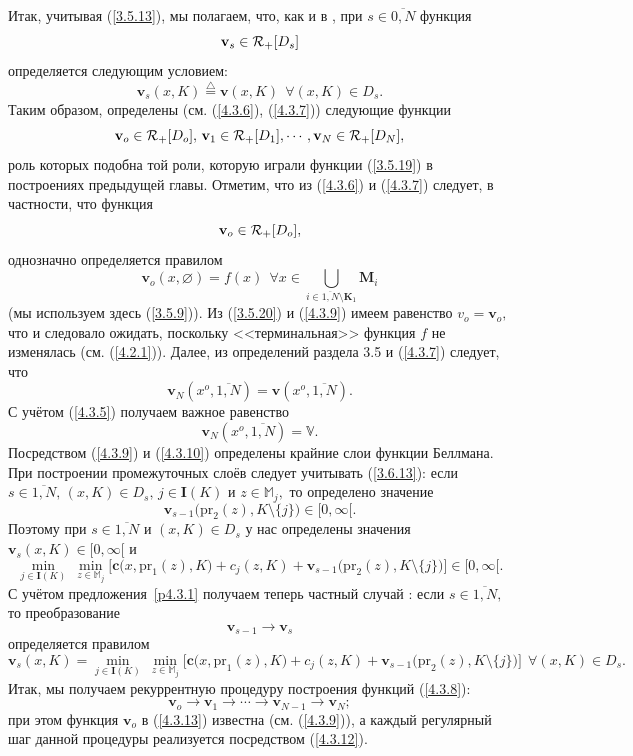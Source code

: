 \documentclass[12pt]{report}
\newcommand{\bfn}{\begin{equation}}
\newcommand{\efn}{\end{equation}}
\newcommand{\df}{\stackrel{\triangle}{=}}
\newcommand{\ov}{\overline}
\newcommand{\sm}{\setminus}
\newcommand{\fa}{\forall}
\newcommand{\car}{{\cal R}}
\newcommand{\bbm}{{\mathbb M}}
\newcommand{\emp}{\varnothing}
\begin{document}
{Итак, учитывая (\ref{3.5.13}), мы полагаем, что, как и в \cite[(6.12)]{Cha3`}, при
$s\in \ov{0,N}$ функция
\bfn\label{4.3.6`}\mathbf{v}_s\in \car_+ [D_s]
\efn
определяется следующим условием:
\bfn\label{4.3.7}\mathbf{v}_s(x,K) \df \mathbf{v}(x,K)\ \ \fa (x,K)\in D_s.
\efn
Таким образом, определены (см. (\ref{4.3.6}), (\ref{4.3.7})) следующие функции
$$
\mathbf{v}_o\in \car_+[D_o],\,\mathbf{v}_1\in \car_+[D_1],\cdots,
\mathbf{v}_N\in \car_+[D_N],
$$
роль которых подобна той роли, которую играли функции (\ref{3.5.19}) в
построениях предыдущей главы. Отметим, что из (\ref{4.3.6}) и (\ref{4.3.7})
следует, в частности, что функция
\bfn\label{4.3.8}
\mathbf{v}_o\in \car_+[D_o],
\efn
однозначно определяется правилом
\bfn\label{4.3.9}\mathbf{v}_o(x,\emp) = f(x)\ \ \fa x\in
\bigcup\limits_{i\in\ov{1,N}\sm \mathbf{K}_1}\mathbf{M}_i
\efn
(мы используем здесь (\ref{3.5.9})). Из (\ref{3.5.20}) и (\ref{4.3.9})
имеем равенство $v_o = \mathbf{v}_o,$ что и следовало ожидать, поскольку
<<терминальная>> функция $f$ не изменялась
(см. (\ref{4.2.1})). Далее, из определений раздела 3.5 и (\ref{4.3.7})
следует, что
$$
\mathbf{v}_N(x^o,\ov{1,N}) = \mathbf{v}(x^o,\ov{1,N}).
$$
С учётом (\ref{4.3.5}) получаем важное равенство
\bfn\label{4.3.10}\mathbf{v}_N(x^o,\ov{1,N})= \mathbb{V}.
\efn
Посредством (\ref{4.3.9}) и (\ref{4.3.10}) определены крайние слои
функции Беллмана. При построении
промежуточных слоёв следует учитывать (\ref{3.6.13}):  если $s\in\ov{1,N},\,
(x,K)\in D_s,\,j\in \mathbf{I}(K)$ и $z\in \bbm_j,$ то определено значение
$$
\mathbf{v}_{s-1}\bigl(\mathrm{pr}_2(z),K\sm\{j\}\bigl)\in [0,\infty[.
$$
Поэтому при $s\in\ov{1,N}$ и $(x,K)\in D_s$ у нас определены значения
$\mathbf{v}_s(x,K)\in [0,\infty[$ и
$$
\min\limits_{j\in \mathbf{I}(K)}\ \min\limits_{z\in\bbm_j}
\bigl[\mathbf{c}\bigl(x,\mathrm{pr}_1(z),K\bigl) +
c_j(z,K) + \mathbf{v}_{s-1}\bigl(\mathrm{pr}_2(z),K\sm\{j\}\bigl)
\bigl]\in [0,\infty[.
$$
С учётом предложения~\ref{p4.3.1}  получаем теперь частный
случай \cite[предложение~6.1]{Cha3`}:
если $s\in\ov{1,N},$ то преобразование
\bfn\label{4.3.11}
\mathbf{v}_{s-1}\longrightarrow \mathbf{v}_s
\efn
определяется правилом
\bfn\label{4.3.12}
\mathbf{v}_s(x,K) =  \min\limits_{j\in \mathbf{I}(K)}\
\min\limits_{z\in\bbm_j}\bigl[\mathbf{c}\bigl(x,\mathrm{pr}_1(z),K\bigl) +
 c_j(z,K) + \mathbf{v}_{s-1}\bigl(\mathrm{pr}_2(z),K\sm\{j\}\bigl)\bigl]\ \
\fa (x,K)\in  D_s.
\efn
Итак, мы получаем рекуррентную процедуру построения функций (\ref{4.3.8}):
\bfn\label{4.3.13}
\mathbf{v}_o\longrightarrow  \mathbf{v}_1\longrightarrow\cdots
\longrightarrow \mathbf{v}_{N-1}\longrightarrow \mathbf{v}_N;
\efn
при этом функция $\mathbf{v}_o$ в (\ref{4.3.13}) известна
(см. (\ref{4.3.9})), а каждый регулярный
шаг данной процедуры реализуется посредством  (\ref{4.3.12}).

}
\end{document}
